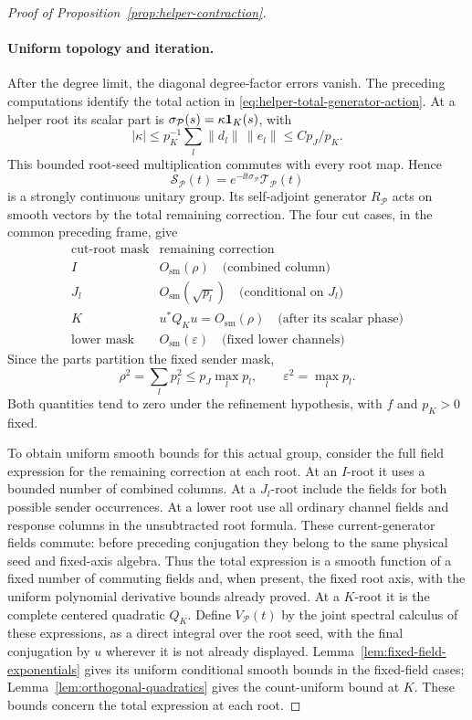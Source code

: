 \begin{proof}[Proof of Proposition~\ref{prop:helper-contraction}]
\paragraph{Uniform topology and iteration.}
After the degree limit, the diagonal degree-factor errors vanish.
The preceding computations identify the total action in
\eqref{eq:helper-total-generator-action}.  At a helper root its scalar
part is \(\sigma_{\mathcal P}(s)=\kappa\mathbf 1_K(s)\), with
\[
 |\kappa|\le p_K^{-1}\sum_l\|d_l\|\,\|e_l\|
             \le C p_J/p_K.
\]
This bounded root-seed multiplication commutes with every root map.
Hence
\[
 \mathcal S_{\mathcal P}(t)
 =e^{-\ii t\sigma_{\mathcal P}}\mathcal T_{\mathcal P}(t)
\]
is a strongly continuous unitary group.  Its self-adjoint generator
\(R_{\mathcal P}\) acts on smooth vectors by the total remaining
correction.  The four cut cases, in the common preceding frame, give
\[
 \begin{array}{c|l}
 \text{cut-root mask}&\text{remaining correction}\\ \hline
 I&O_{\mathrm{sm}}(\rho)\quad\text{(combined column)}\\
 J_l&O_{\mathrm{sm}}(\sqrt{p_l})\quad\text{(conditional on }J_l\text{)}\\
 K&u^*Q_Ku=O_{\mathrm{sm}}(\rho)\quad\text{(after its scalar phase)}\\
 \text{lower mask}&O_{\mathrm{sm}}(\varepsilon)
                  \quad\text{(fixed lower channels)}
 \end{array}
\]
Since the parts partition the fixed sender mask,
\[
 \rho^2=\sum_l p_l^2\le p_J\max_l p_l,
 \qquad \varepsilon^2=\max_l p_l.
\]
Both quantities tend to zero under the refinement hypothesis, with
\(f\) and \(p_K>0\) fixed.

To obtain uniform smooth bounds for this actual group, consider the
full field expression for the remaining correction at each root.  At
an \(I\)-root it uses a bounded number of combined columns.  At a
\(J_l\)-root include the fields for both possible sender occurrences.
At a lower root use all ordinary channel fields and response columns
in the unsubtracted root formula.  These current-generator fields
commute: before preceding conjugation they belong to the same physical
seed and fixed-axis algebra.  Thus the total expression is a smooth
function of a fixed number of commuting fields and, when present, the
fixed root axis, with the uniform polynomial derivative bounds already
proved.  At a \(K\)-root it is the complete centered quadratic
\(Q_K\).  Define \(V_{\mathcal P}(t)\) by the joint spectral
calculus of these expressions, as a direct integral over the root seed,
with the final conjugation by \(u\) wherever it is not already
displayed.  Lemma~\ref{lem:fixed-field-exponentials} gives its uniform
conditional smooth bounds in the fixed-field cases;
Lemma~\ref{lem:orthogonal-quadratics} gives the count-uniform bound at
\(K\).  These bounds concern the total expression at each root.


\end{proof}
